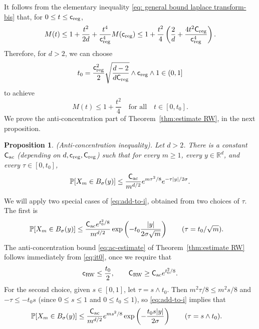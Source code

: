 \documentclass[11pt,a4paper]{article}
\numberwithin{equation}{section}
\theoremstyle{plain}
\newtheorem{Prop}[Thm]{Proposition}
\theoremstyle{definition}
\newcommand\1{\mathds{1}}
\newcommand\Crw{\mathsf{C}_{\textup{RW}}}
\newcommand\crw{\mathsf{c}_{\textup{RW}}}
\newcommand\CM{\mathsf{C}_{\textup{reg}}}
\newcommand\cM{\mathsf{c}_{\textup{reg}}}
\newcommand\creg{\mathsf{c}_{\textup{reg}}}
\newcommand\Creg{\mathsf{C}_{\textup{reg}}}
\newcommand{\CAC}{\mathsf C_{\textup{ac}}}
\begin{document}
It follows from the elementary inequality \eqref{eq: general bound laplace transform-bis}
that, for $0 \le t \le \cM$,
\begin{equation}
\label{eq:t0def}
    M(t) \le 1 + \frac{t^2}{2d} + \frac{t^4}{\cM^4}M(\cM)
    \le
    1 + \frac{t^2}{4}  \left( \frac{2}{d} +\frac{4t^2\CM}{\cM^4} \right).
\end{equation}
Therefore, for $d>2$, we can choose
\begin{equation}
    t_0=\frac{\cM^2}{2}\sqrt{\frac{d-2}{d\CM}} \wedge \cM\wedge 1\in (0,1]
\end{equation}
to achieve
\begin{equation}
\label{eq:t0def}
    M(t) \le 1+\frac{t^2}{4}\quad \text{for all} \quad t \in [0,t_0].
\end{equation}
We prove the anti-concentration part of Theorem~\ref{thm:estimate RW},
in the next proposition.

\begin{Prop}
\label{prop:anti}
{\rm (Anti-concentration inequality).} Let $d>2$.
There is a constant $\CAC$ (depending on $d,\creg,\Creg$) such that
for every $m\ge 1$, every $y\in \mathbb R^d$, and every $\tau \in [0,t_0]$,
\begin{equation}
\label{eq:add-to-i}
    \mathbb P[X_m\in B_\sigma(y)]
    \leq
    \frac{\CAC}{m^{d/2}}
    e^{m\tau^2/8}
    e^{- \tau |y|/ 2\sigma  }
    .
\end{equation}
\end{Prop}
We will apply two special cases of \eqref{eq:add-to-i}, obtained
from two choices of $\tau$.  The first is
\begin{align}
\label{eq:it0}
    \mathbb P[X_m\in B_\sigma(y)]
    &\leq
    \frac{\CAC e^{t_0^2/8}}{m^{d/2}}
    \exp\left(-t_0 \frac{|y|}{2 \sigma \sqrt{m}} \right)
      \qquad (\tau =t_0/\sqrt{m}).
\end{align}
The anti-concentration bound \eqref{eq:ac-estimate} of Theorem~\ref{thm:estimate RW} follows immediately from
\eqref{eq:it0}, once we require that
\begin{equation}
\label{eq:crw-anti-concentration}
    \crw \le \frac{t_0}{2}, \qquad \Crw \ge \CAC e^{t_0^2/8}.
\end{equation}
For the second choice,
given $s \in [0,1]$, let $\tau =s \wedge t_0$.  Then
$m^2\tau /8 \le m^2 s/8$ and  $-\tau \le - t_0 s$ (since $0\leq s\le 1$ and $0\leq t_0\le 1$), so
\eqref{eq:add-to-i} implies that
\begin{align}
\label{eq:is}
    \mathbb P[X_m\in B_\sigma(y)]
    &\leq
    \frac{\CAC }{m^{d/2}} e^{ms^2/8}
    \exp\left(- \frac{t_0s|y|}{2\sigma}\right)
      \qquad (\tau = s \wedge t_0  ).
\end{align}
\end{document}
